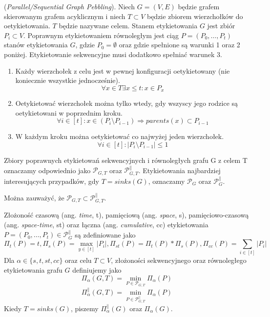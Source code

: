 \begin{definition}
	(\textit{Parallel/Sequential Graph Pebbling}). Niech $G = (V, E)$ będzie grafem skierowanym grafem acyklicznym i niech $T \subset V$ będzie zbiorem wierzchołków do oetykietowania. $T$ będzie nazywane celem.
	Stanem etykietowania $G$ jest zbiór $P_{i} \subset V$.
	Poprawnym etykietowaniem równoległym jest ciąg $P = (P_{0}, \dots , P_{t})$ stanów etykietowania $G$,
	gdzie $P_{0} = \emptyset $ oraz gdzie spełnione są warunki 1 oraz 2 poniżej.
	Etykietowanie sekwencyjne musi dodatkowo spełniać warunek 3.
	\begin{enumerate}
		\item Każdy wierzchołek z celu jest w pewnej konfiguracji oetykietowany (nie koniecznie wszystkie jednocześnie).
		$$ \forall x \in T \exists x \leq t : x \in P_{x} $$
		
		\item Oetykietować wierzchołek można tylko wtedy, gdy wszyscy jego rodzice
		są oetykietowani w poprzednim kroku.
		$$ \forall i \in [t] : x \in (P_{i} \setminus P_{i-1}) \Rightarrow parents(x) \subset P_{i-1} $$
		
		\item W każdym kroku można oetykietować co najwyżej jeden wierzchołek.
		$$ \forall i \in [t]: | P_{i} \setminus P_{i-1} | \leq 1 $$
	\end{enumerate}
	Zbiory poprawnych etykietowań sekwencyjnych i równoległych grafu G z celem T oznaczamy odpowiednio jako 
	$ \mathcal{P}_{G,T} $ oraz $ \mathcal{P}_{G,T}^{ \parallel } $.
	Etykietowania najbardziej interesujących przypadków, gdy $T = sinks(G)$, oznaczamy $ \mathcal{P}_{G} $ oraz $ \mathcal{P}_{G}^{ \parallel } $.
\end{definition}


 Można zauważyć, że $ \mathcal{P}_{G,T} \subset  \mathcal{P}_{G,T}^{ \parallel } $.

\begin{definition}
	Złożoność czasową (ang. \textit{time}, t), pamięciową (ang. \textit{space}, s), pamięciowo-czasową (ang. \textit{space-time}, st) oraz łączna (ang. \textit{cumulative}, cc) etykietowania $ P = (P_{0}, \dots , P_{t} ) \in \mathcal{P}_{G}^{ \parallel } $ są zdefiniowane jako
	$$ \Pi_{t}(P) = t, \Pi_{s}(P) = \max_{y \in [t]} | P_{i} |, \Pi_{st}(P) = \Pi_{t}(P) * \Pi_{s}(P), \Pi_{cc}(P) = \sum_{i \in [t]}| P_{i}|$$
	Dla $ \alpha \in \{s, t, st, cc \}$ oraz celu $T \subset V $, złożoności sekwencyjnego oraz równoległego
	etykietowania grafu $G$ definiujemy jako
	$$ \Pi_{ \alpha }(G, T) = \min_{P \in \mathcal{P}_{G,T}} \Pi_{ \alpha } (P) $$
	$$ \Pi_{ \alpha }^{ \parallel }(G, T) = \min_{P \in \mathcal{P}_{G,T}^{ \parallel }} \Pi_{ \alpha } (P) $$
	Kiedy $T = sinks(G)$, piszemy $ \Pi_{ \alpha }^{ \parallel }(G) $ oraz $ \Pi_{ \alpha }(G) $.
	
\end{definition}

